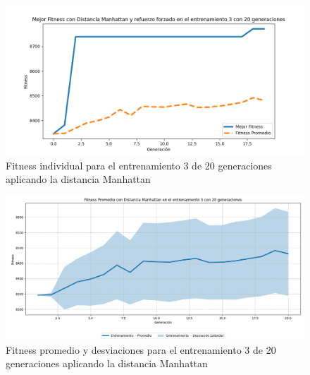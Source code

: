 \documentclass[conference]{IEEEtran}
\begin{document}
\begin{figure}[H]
    \centering
    \includegraphics[width=0.9 \linewidth]{Manhattan/Fitness_individual_20Gen/Fitness_3_Manh_20Gen.png}
    \caption{Fitness individual para el entrenamiento 3 de 20 generaciones aplicando la distancia Manhattan}
    \label{fig:manhattan_3_20}
\end{figure}
\begin{figure}[H]
    \centering
    \includegraphics[width=0.9 \linewidth]{Manhattan/Fitness_individual_20Gen/Fitness_3_Manh_20Gen_Sombra.png}
    \caption{Fitness promedio y desviaciones para el entrenamiento 3 de 20 generaciones aplicando la distancia Manhattan}
    \label{fig:manhattan_3_20_sombra}
\end{figure}
\end{document}
